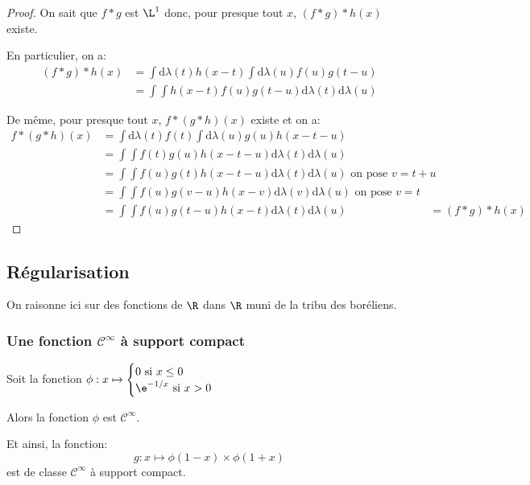 \begin{proof}
On sait que $f*g$ est $\L^1$ donc, pour presque tout $x$, $(f*g)*h(x)$ existe. 

\medskip
En particulier, on a:
\begin{align*}
(f*g)*h(x) & = \displaystyle{\int} \mathrm d \lambda(t) h(x-t) \displaystyle{\int} \mathrm d \lambda(u) f(u) g(t-u) \\
 & = \displaystyle{\int} \displaystyle{\int}  h(x-t) f(u) g(t-u) \mathrm d \lambda(t) \mathrm d \lambda(u)
\end{align*}

De même, pour presque tout $x$, $f*(g*h)(x)$ existe et on a:
\begin{align*}
f*(g*h)(x) & = \displaystyle{\int} \mathrm d \lambda(t) f(t) \displaystyle{\int} \mathrm d \lambda(u) g(u) h(x-t-u) \\
 & = \displaystyle{\int} \displaystyle{\int}  f(t) g(u) h(x-t-u) \mathrm d \lambda(t) \mathrm d \lambda(u) \\
 & = \displaystyle{\int} \displaystyle{\int}  f(u) g(t) h(x-t-u) \mathrm d \lambda(t) \mathrm d \lambda(u)  \text{ on  pose }v=t+u \\
  & = \displaystyle{\int} \displaystyle{\int}  f(u) g(v-u) h(x-v) \mathrm d \lambda(v) \mathrm d \lambda(u) \text{ on  pose }v=t \\
  & = \displaystyle{\int} \displaystyle{\int}  f(u) g(t-u) h(x-t) \mathrm d \lambda(t) \mathrm d \lambda(u) 
  & = (f*g)*h(x)
\end{align*}
\end{proof}



\subsection{Régularisation}

On raisonne ici sur des fonctions de $\R$ dans $\R$ muni de la tribu des boréliens.

\subsubsection{Une fonction $\mathbf{\mathcal{C}^{\infty}}$ à support compact}

\begin{lem}
\label{exemple_cinfty}
Soit la fonction $\phi: x \mapsto 
\begin{cases}0 \text{ si }x \leq 0\\
\e^{-1/x} \text{ si }x>0
\end{cases}$

Alors la fonction $\phi$ est $\mathcal{C}^{\infty}$.

Et ainsi, la fonction:
\[
g: x \mapsto \phi(1-x) \times \phi(1+x)
\]
est de classe $\mathcal{C}^{\infty}$ à support compact.
\end{lem}

